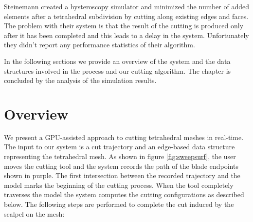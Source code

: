Steinemann \etal \cite{Steinemann} created a hysteroscopy simulator and minimized the number of added elements 
after a tetrahedral subdivision by cutting along existing edges and faces. The problem with their system is that
the result of the cutting is produced only after it has been completed and this leads to a delay in the system. 
Unfortunately they didn't report any performance statistics of their algorithm. 

In the following sections we provide an overview of the system and the data structures involved in the process 
and our cutting algorithm. The chapter is concluded by the analysis of the simulation results.

\section{Overview}
We present a GPU-assisted approach to cutting tetrahedral meshes in real-time. 
The input to our system is a cut trajectory and an edge-based data structure representing the tetrahedral mesh. 
As shown in figure \ref{fig:sweepsurf}, the user moves the cutting tool and the system records the path of the 
blade endpoints shown in purple. The first intersection between the recorded trajectory and the model marks the 
beginning of the cutting process. When the tool completely traverses the model the system computes the cutting
configurations as described below. The following steps are performed to complete the cut induced by the scalpel on the mesh:


